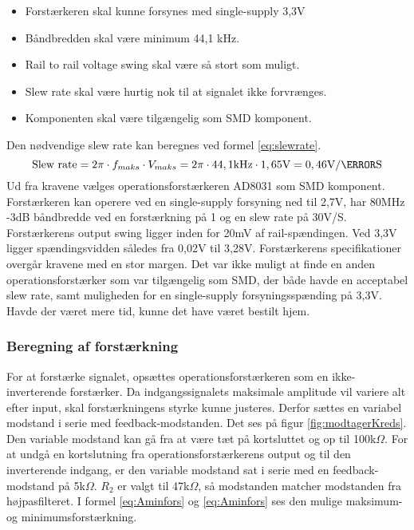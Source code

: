 \begin{itemize}
	\item Forstærkeren skal kunne forsynes med  single-supply 3,3V
	\item Båndbredden skal være minimum 44,1 kHz.
	\item Rail to rail voltage swing skal være så stort som muligt. 
	\item Slew rate skal være hurtig nok til at signalet ikke forvrænges. 
	\item Komponenten skal være tilgængelig som SMD komponent. 
\end{itemize}
Den nødvendige slew rate kan beregnes ved formel \ref{eq:slewrate}.\cite{slewrate}
\begin{equation}
\label{eq:slewrate}
\text{Slew rate} = 2 \pi \cdot f_{maks} \cdot V_{maks} = 2\pi \cdot 44,1\text{kHz} \cdot 1,65\text{V} = 0,46\text{V/\micro S}
\end{equation}
Ud fra kravene vælges operationsforstærkeren AD8031 som SMD komponent. 
Forstærkeren kan operere ved en single-supply forsyning ned til 2,7V, har 80MHz -3dB båndbredde ved en forstærkning på 1 og en slew rate på 30V/\micro S. 
Forstærkerens output swing ligger inden for 20mV af rail-spændingen. Ved 3,3V ligger spændingsvidden således fra 0,02V til 3,28V. 
Forstærkerens specifikationer overgår kravene med en stor margen. 
Det var ikke muligt at finde en anden operationsforstærker som var tilgængelig som SMD, der både havde en acceptabel slew rate, samt muligheden for en single-supply forsyningsspænding på 3,3V. 
Havde der været mere tid, kunne det have været bestilt hjem. 

\subsubsection{Beregning af forstærkning}
For at forstærke signalet, opsættes operationsforstærkeren som en ikke-inverterende forstærker. 
Da indgangssignalets maksimale amplitude vil variere alt efter input, skal forstærkningens styrke kunne justeres. 
Derfor sættes en variabel modstand i serie med feedback-modstanden. 
Det ses på figur \ref{fig:modtagerKreds}. 
Den variable modstand kan gå fra at være tæt på kortsluttet og op til 100k$\Omega$.
For at undgå en kortslutning fra operationsforstærkerens output og til den inverterende indgang, er den variable modstand sat i serie med en feedback-modstand på 5k$\Omega$. 
$R_2$ er valgt til 47k$\Omega$, så modstanden matcher modstanden fra højpasfilteret. 
I formel \ref{eq:Aminfors} og \ref{eq:Aminfors} ses den mulige maksimum- og minimumsforstærkning.

